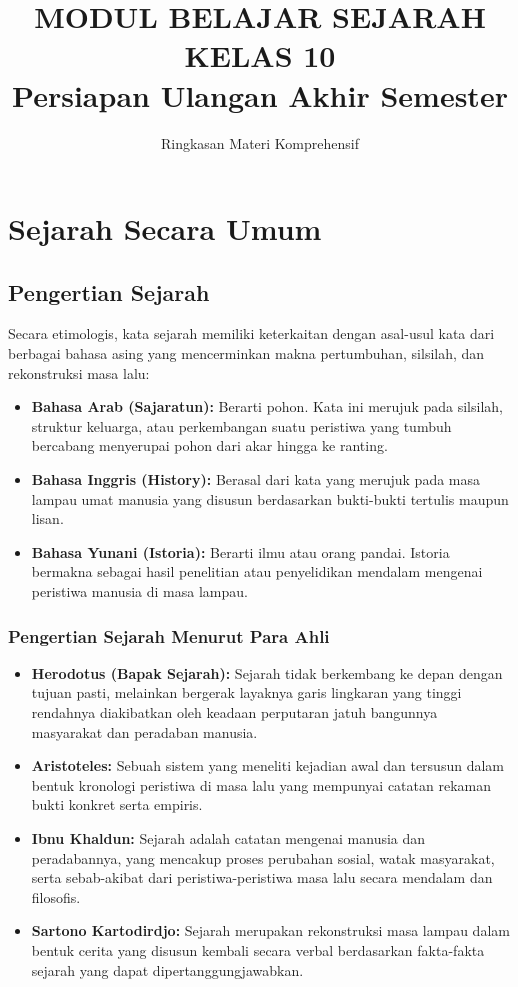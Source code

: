\documentclass[12pt, a4paper]{article}
\title{MODUL BELAJAR SEJARAH KELAS 10\\ \large Persiapan Ulangan Akhir Semester}
\author{Ringkasan Materi Komprehensif}
\date{}
\begin{document}
\maketitle

\tableofcontents
\newpage

\section{Sejarah Secara Umum}
\subsection{Pengertian Sejarah}
Secara etimologis, kata sejarah memiliki keterkaitan dengan asal-usul kata dari berbagai bahasa asing yang mencerminkan makna pertumbuhan, silsilah, dan rekonstruksi masa lalu:
\begin{itemize}
	\item \textbf{Bahasa Arab (Sajaratun):} Berarti pohon. Kata ini merujuk pada silsilah, struktur keluarga, atau perkembangan suatu peristiwa yang tumbuh bercabang menyerupai pohon dari akar hingga ke ranting.
	\item \textbf{Bahasa Inggris (History):} Berasal dari kata yang merujuk pada masa lampau umat manusia yang disusun berdasarkan bukti-bukti tertulis maupun lisan.
	\item \textbf{Bahasa Yunani (Istoria):} Berarti ilmu atau orang pandai. Istoria bermakna sebagai hasil penelitian atau penyelidikan mendalam mengenai peristiwa manusia di masa lampau.
\end{itemize}

\subsubsection{Pengertian Sejarah Menurut Para Ahli}
\begin{itemize}
	\item \textbf{Herodotus (Bapak Sejarah):} Sejarah tidak berkembang ke depan dengan tujuan pasti, melainkan bergerak layaknya garis lingkaran yang tinggi rendahnya diakibatkan oleh keadaan perputaran jatuh bangunnya masyarakat dan peradaban manusia.
	\item \textbf{Aristoteles:} Sebuah sistem yang meneliti kejadian awal dan tersusun dalam bentuk kronologi peristiwa di masa lalu yang mempunyai catatan rekaman bukti konkret serta empiris.
	\item \textbf{Ibnu Khaldun:} Sejarah adalah catatan mengenai manusia dan peradabannya, yang mencakup proses perubahan sosial, watak masyarakat, serta sebab-akibat dari peristiwa-peristiwa masa lalu secara mendalam dan filosofis.
	\item \textbf{Sartono Kartodirdjo:} Sejarah merupakan rekonstruksi masa lampau dalam bentuk cerita yang disusun kembali secara verbal berdasarkan fakta-fakta sejarah yang dapat dipertanggungjawabkan.
\end{itemize}
\end{document}
